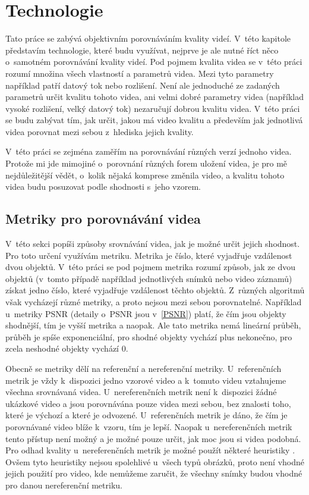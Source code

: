 \documentclass[thesis=M,czech]{FITthesis}[2016/06/26]
\begin{document}
\chapter{Technologie}
\label{technologie}
Tato práce se zabývá objektivním porovnáváním kvality videí. V~této kapitole představím technologie, které budu využívat, nejprve je ale nutné říct něco o~samotném porovnávání kvality videí. Pod pojmem kvalita videa se v~této práci rozumí množina všech vlastností a parametrů videa. Mezi tyto parametry například patří datový tok nebo rozlišení. Není ale jednoduché ze zadaných parametrů určit kvalitu tohoto videa, ani velmi dobré parametry videa (například vysoké rozlišení, velký datový tok) nezaručují dobrou kvalitu videa. V~této práci se budu zabývat tím, jak určit, jakou má video kvalitu a především jak jednotlivá videa porovnat mezi sebou z~hlediska jejich kvality.

V~této práci se zejména zaměřím na porovnávání různých verzí jednoho videa. Protože mi jde mimojiné o~porovnání různých forem uložení videa, je pro mě nejdůležitější vědět, o~kolik nějaká komprese změnila video, a kvalitu tohoto videa budu posuzovat podle shodnosti s~jeho vzorem. 
\section{Metriky pro porovnávání videa}
V~této sekci popíši způsoby srovnávání videa, jak je možné určit jejich shodnost. Pro toto určení využívám metriku.
Metrika je číslo, které vyjadřuje vzdálenost dvou objektů. V~této práci se pod pojmem metrika rozumí způsob, jak ze dvou objektů (v~tomto případě například jednotlivých snímků nebo video záznamů) získat jedno číslo, které vyjadřuje vzdálenost těchto objektů. Z~různých algoritmů však vycházejí různé metriky, a proto nejsou mezi sebou porovnatelné. Například u~metriky PSNR (detaily o~PSNR jsou v~\autoref{PSNR}) platí, že čím jsou objekty shodnější, tím je vyšší metrika a naopak. Ale tato metrika nemá lineární průběh, průběh je spíše exponenciální, pro shodné objekty vychází plus nekonečno, pro zcela neshodné objekty vychází 0.

Obecně se metriky dělí na referenční a nereferenční metriky. U~referenčních metrik je vždy k~dispozici jedno vzorové video a k~tomuto videu vztahujeme všechna srovnávaná videa. U~nereferenčních metrik není k~dispozici žádné ukázkové video a jsou porovnávána pouze videa mezi sebou, bez znalosti toho, které je výchozí a které je odvozené.
U~referenčních metrik je dáno, že čím je porovnávané video blíže k~vzoru, tím je lepší. Naopak u~nereferenčních metrik tento přístup není možný a je možné pouze určit, jak moc jsou si videa podobná. Pro odhad kvality u~nereferenčních metrik je možné použít některé heuristiky \cite{nonref}. Ovšem tyto heuristiky nejsou spolehlivé u~všech typů obrázků, proto není vhodné jejich použití pro video, kde nemůžeme zaručit, že všechny snímky budou vhodné pro danou nereferenční metriku.
\end{document}
